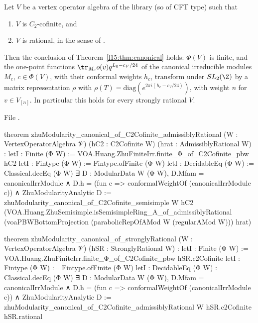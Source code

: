 \begin{theorem}\label{l15:thm:rational}
Let $V$ be a vertex operator algebra of the library (so of CFT type) such that
\begin{enumerate}
\item[(a)] $V$ is $C_2$-cofinite, and
\item[(r)] $V$ is rational, in the sense of .
\end{enumerate}
Then the conclusion of Theorem~\ref{l15:thm:canonical} holds: $\Phi(V)$ is finite, and the one-point functions
$\tr_{M_c}o(v)q^{L_0-c_V/24}$ of the canonical irreducible modules $M_c$, $c\in\Phi(V)$, with their conformal weights $h_c$,
transform under $\lfifteenSL$ by a matrix representation $\rho$ with $\rho(T)=\mathrm{diag}(e^{2\pi i(h_c-c_V/24)})$, with
weight $n$ for $v\in V_{[n]}$. In particular this holds for every strongly rational $V$.
\end{theorem}
\noindent File .
\begin{leancode}
theorem zhuModularity_canonical_of_C2Cofinite_admissiblyRational (W : VertexOperatorAlgebra 𝒱)
    (hC2 : C2Cofinite W) (hrat : AdmissiblyRational W) :
    letI : Finite (Φ W) := VOA.Huang.ZhuFiniteIrr.finite_Φ_of_C2Cofinite_pbw hC2
    letI : Fintype (Φ W) := Fintype.ofFinite (Φ W)
    letI : DecidableEq (Φ W) := Classical.decEq (Φ W)
    ∃ D : ModularData W (Φ W), D.Mfam = canonicalIrrModule ∧
      D.h = (fun c => conformalWeightOf (canonicalIrrModule c)) ∧ ZhuModularityAnalytic D :=
  zhuModularity_canonical_of_C2Cofinite_semisimple W hC2
    (VOA.Huang.ZhuSemisimple.isSemisimpleRing_A_of_admissiblyRational
      (voaPBWBottomProjection (parabolicRepOfAMod W (regularAMod W))) hrat)

theorem zhuModularity_canonical_of_stronglyRational (W : VertexOperatorAlgebra 𝒱)
    (hSR : StronglyRational W) :
    letI : Finite (Φ W) := VOA.Huang.ZhuFiniteIrr.finite_Φ_of_C2Cofinite_pbw hSR.c2Cofinite
    letI : Fintype (Φ W) := Fintype.ofFinite (Φ W)
    letI : DecidableEq (Φ W) := Classical.decEq (Φ W)
    ∃ D : ModularData W (Φ W), D.Mfam = canonicalIrrModule ∧
      D.h = (fun c => conformalWeightOf (canonicalIrrModule c)) ∧ ZhuModularityAnalytic D :=
  zhuModularity_canonical_of_C2Cofinite_admissiblyRational W hSR.c2Cofinite hSR.rational
\end{leancode}

